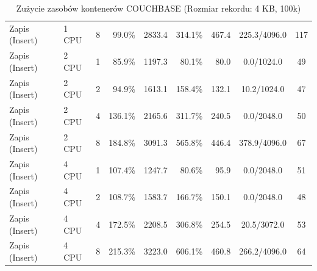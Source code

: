\begin{table}[ht]
{\begin{tabular}{llcrrrrcc}
Zapis (Insert) & 1 CPU & 8 & 99.0\% & 2833.4 & 314.1\% & 467.4 & 225.3/4096.0 & 117 \\
Zapis (Insert) & 2 CPU & 1 & 85.9\% & 1197.3 & 80.1\% & 80.0 & 0.0/1024.0 & 49 \\
Zapis (Insert) & 2 CPU & 2 & 94.9\% & 1613.1 & 158.4\% & 132.1 & 10.2/1024.0 & 47 \\
Zapis (Insert) & 2 CPU & 4 & 136.1\% & 2165.6 & 311.7\% & 240.5 & 0.0/2048.0 & 50 \\
Zapis (Insert) & 2 CPU & 8 & 184.8\% & 3091.3 & 565.8\% & 446.4 & 378.9/4096.0 & 67 \\
Zapis (Insert) & 4 CPU & 1 & 107.4\% & 1247.7 & 80.6\% & 95.9 & 0.0/2048.0 & 51 \\
Zapis (Insert) & 4 CPU & 2 & 108.7\% & 1583.7 & 166.7\% & 150.1 & 0.0/2048.0 & 48 \\
Zapis (Insert) & 4 CPU & 4 & 172.5\% & 2208.5 & 306.8\% & 254.5 & 20.5/3072.0 & 53 \\
Zapis (Insert) & 4 CPU & 8 & 215.3\% & 3223.0 & 606.1\% & 460.8 & 266.2/4096.0 & 64 \\
\bottomrule
\end{tabular}%
}
\caption{Zużycie zasobów kontenerów COUCHBASE (Rozmiar rekordu: 4 KB, 100k)}
\label{tab:resources_couchbase_medium_100000}
\end{table}
